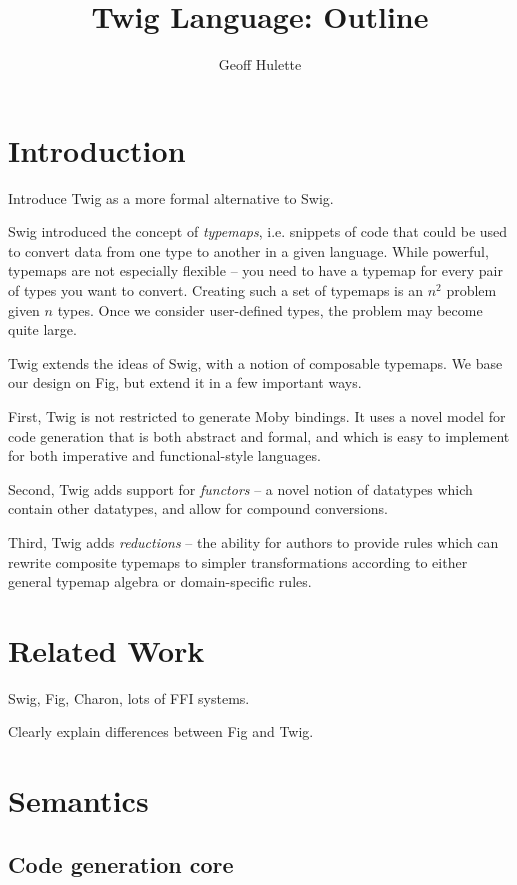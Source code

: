 \documentclass{article}
\begin{document}
\title{Twig Language: Outline}
\author{Geoff Hulette}

\maketitle

\section{Introduction}

Introduce Twig as a more formal alternative to Swig.

Swig introduced the concept of \emph{typemaps}, i.e. snippets of code that could be used to convert data from one type to another in a given language. While powerful, typemaps are not especially flexible -- you need to have a typemap for every pair of types you want to convert. Creating such a set of typemaps is an $n^2$ problem given $n$ types. Once we consider user-defined types, the problem may become quite large.

Twig extends the ideas of Swig, with a notion of composable typemaps. We base our design on Fig, but extend it in a few important ways.

First, Twig is not restricted to generate Moby bindings. It uses a novel model for code generation that is both abstract and formal, and which is easy to implement for both imperative and functional-style languages.

Second, Twig adds support for \emph{functors} -- a novel notion of datatypes which contain other datatypes, and allow for compound conversions.

Third, Twig adds \emph{reductions} -- the ability for authors to provide rules which can rewrite composite typemaps to simpler transformations according to either general typemap algebra or domain-specific rules.

\section{Related Work}

Swig, Fig, Charon, lots of FFI systems. 

Clearly explain differences between Fig and Twig.


\section{Semantics}

\subsection{Code generation core}
\end{document}
